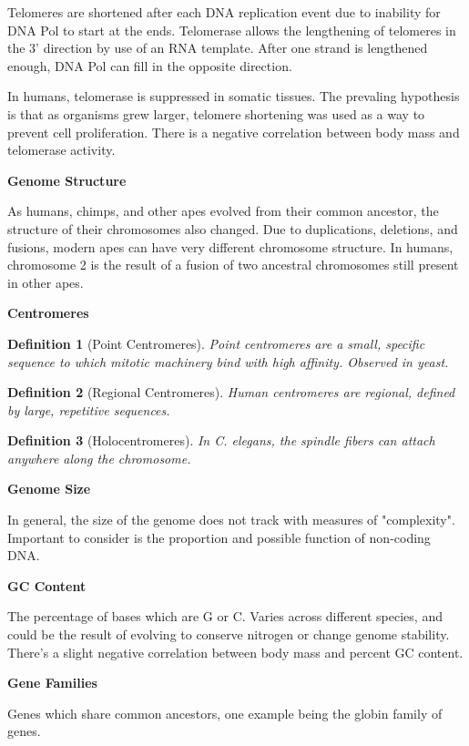 \documentclass{tufte-handout}
\theoremstyle{noparens}
\newtheorem*{define}{Definition}
\begin{document}
Telomeres are shortened after each DNA replication event due to inability for DNA Pol to start at the ends. Telomerase allows the lengthening of telomeres in the 3' direction by use of an RNA template. After one strand is lengthened enough, DNA Pol can fill in the opposite direction.

In humans, telomerase is suppressed in somatic tissues. The prevaling hypothesis is that as organisms grew larger, telomere shortening was used as a way to prevent cell proliferation. There is a negative correlation between body mass and telomerase activity.

\textbf{Genome Structure}

As humans, chimps, and other apes evolved from their common ancestor, the structure of their chromosomes also changed. Due to duplications, deletions, and fusions, modern apes can have very different chromosome structure. In humans, chromosome 2 is the result of a fusion of two ancestral chromosomes still present in other apes.

\textbf{Centromeres}

\begin{define}[Point Centromeres]
Point centromeres are a small, specific sequence to which mitotic machinery bind with high affinity. Observed in yeast.
\end{define}

\begin{define}[Regional Centromeres]
Human centromeres are regional, defined by large, repetitive sequences.
\end{define}

\begin{define}[Holocentromeres]
In \emph{C. elegans}, the spindle fibers can attach anywhere along the chromosome.
\end{define}

\textbf{Genome Size}

In general, the size of the genome does not track with measures of "complexity". Important to consider is the proportion and possible function of non-coding DNA.

\textbf{GC Content}

The percentage of bases which are G or C. Varies across different species, and could be the result of evolving to conserve nitrogen or change genome stability. There's a slight negative correlation between body mass and percent GC content.

\textbf{Gene Families}

Genes which share common ancestors, one example being the globin family of genes.
\end{document}
